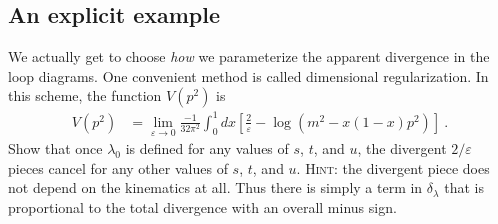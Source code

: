 \documentclass[12pt]{article}
\numberwithin{equation}{section}    %
\begin{document}
\subsection{An explicit example}

We actually get to choose \emph{how} we parameterize the apparent divergence in the loop diagrams. One convenient method is called dimensional regularization. In this scheme, the function $V(p^2)$ is
\begin{align}
	V(p^2) &= \lim_{\varepsilon\to 0} \frac{-1}{32\pi^2}\int_0^1 dx
	\left[ \frac{2}{\varepsilon} - \log\left(m^2 - x(1-x)p^2\right) \right] \ .
\end{align}
Show that once $\lambda_0$ is defined for any values of $s$, $t$, and $u$, the divergent $2/\varepsilon$ pieces cancel for any other values of $s$, $t$, and $u$. \textsc{Hint:} the divergent piece does not depend on the kinematics at all. Thus there is simply a term in $\delta_\lambda$ that is proportional to the total divergence with an overall minus sign.
\end{document}
